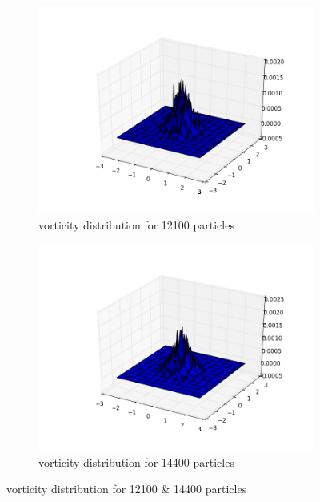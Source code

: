 \documentclass[a4paper,11pt]{article}
\begin{document}
\begin{figure}[h]
	\centering
	\begin{subfigure}[h]{.5\textwidth}
  		\centering
  		\includegraphics[width=.8\linewidth]{vorticity_distribution_for_12100_particles.png}
  		\caption{vorticity distribution for 12100 particles}
  		\label{fig:121}
	\end{subfigure}%
	\begin{subfigure}[h]{.5\textwidth}
  		\centering
  		\includegraphics[width=.8\linewidth]{vorticity_distribution_for_14400_particles.png}
  		\caption{vorticity distribution for 14400 particles}
  		\label{fig:144}
	\end{subfigure}
	\label{fig:Question 1a}
  \caption{vorticity distribution for 12100 \& 14400 particles}

\end{figure}
\end{document}
